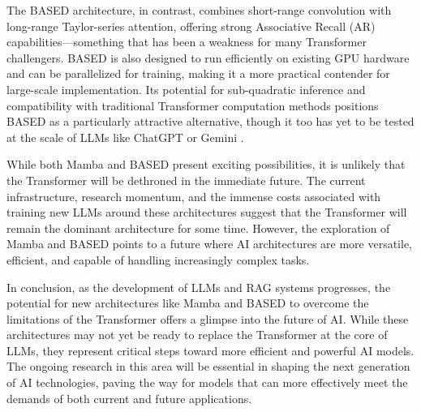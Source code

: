The BASED architecture, in contrast, combines short-range convolution with long-range Taylor-series attention, offering strong Associative Recall (AR) capabilities—something that has been a weakness for many Transformer challengers. BASED is also designed to run efficiently on existing GPU hardware and can be parallelized for training, making it a more practical contender for large-scale implementation. Its potential for sub-quadratic inference and compatibility with traditional Transformer computation methods positions BASED as a particularly attractive alternative, though it too has yet to be tested at the scale of LLMs like ChatGPT or Gemini \cite{arora2023based}.

While both Mamba and BASED present exciting possibilities, it is unlikely that the Transformer will be dethroned in the immediate future. The current infrastructure, research momentum, and the immense costs associated with training new LLMs around these architectures suggest that the Transformer will remain the dominant architecture for some time. However, the exploration of Mamba and BASED points to a future where AI architectures are more versatile, efficient, and capable of handling increasingly complex tasks. \newline

In conclusion, as the development of LLMs and RAG systems progresses, the potential for new architectures like Mamba and BASED to overcome the limitations of the Transformer offers a glimpse into the future of AI. While these architectures may not yet be ready to replace the Transformer at the core of LLMs, they represent critical steps toward more efficient and powerful AI models. The ongoing research in this area will be essential in shaping the next generation of AI technologies, paving the way for models that can more effectively meet the demands of both current and future applications.
